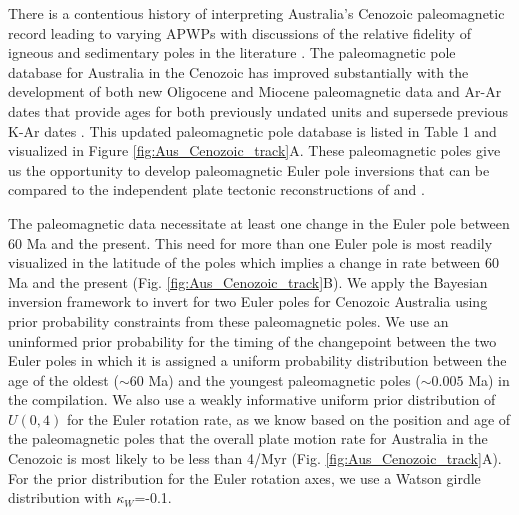\documentclass[11pt,letterpaper]{article}
\begin{document}
There is a contentious history of interpreting Australia's Cenozoic paleomagnetic record leading to varying APWPs with discussions of the relative fidelity of igneous and sedimentary poles in the literature \cite[e.g.][]{Idnurm1985a, Musgrave1989a, Idnurm1994a, Hansma2019a}. The paleomagnetic pole database for Australia in the Cenozoic has improved substantially with the development of both new Oligocene and Miocene paleomagnetic data \citep{Hansma2018a, Hansma2019a} and Ar-Ar dates that provide ages for both previously undated units and supersede previous K-Ar dates \citep{Cohen2008a,Knesel2008a,Cohen2013a}. This updated paleomagnetic pole database is listed in Table 1 and visualized in Figure \ref{fig:Aus_Cenozoic_track}A. These paleomagnetic poles give us the opportunity to develop paleomagnetic Euler pole inversions that can be compared to the independent plate tectonic reconstructions of \cite{Muller2016a} and \cite{Torsvik2017a}. 

The paleomagnetic data necessitate at least one change in the Euler pole between 60 Ma and the present. This need for more than one Euler pole is most readily visualized in the latitude of the poles which implies a change in rate between 60 Ma and the present (Fig. \ref{fig:Aus_Cenozoic_track}B). We apply the Bayesian inversion framework to invert for two Euler poles for Cenozoic Australia using prior probability constraints from these paleomagnetic poles. We use an uninformed prior probability for the timing of the changepoint between the two Euler poles in which it is assigned a uniform probability distribution between the age of the oldest ($\sim60$ Ma) and the youngest paleomagnetic poles ($\sim0.005$ Ma) in the compilation. We also use a weakly informative uniform prior distribution of $U(0,4)$ for the Euler rotation rate, as we know based on the position and age of the paleomagnetic poles that the overall plate motion rate for Australia in the Cenozoic is most likely to be less than 4\textdegree/Myr (Fig. \ref{fig:Aus_Cenozoic_track}A). For the prior distribution for the Euler rotation axes, we use a Watson girdle distribution with $\kappa_W$=-0.1. 
\end{document}
